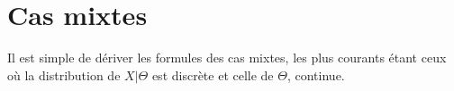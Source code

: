 \section{Cas mixtes}
\label{sec:estimation-bayesienne:mixte}

Il est simple de dériver les formules des cas mixtes, les plus
courants étant ceux où la distribution de $X|\Theta$ est discrète et
celle de $\Theta$, continue.


